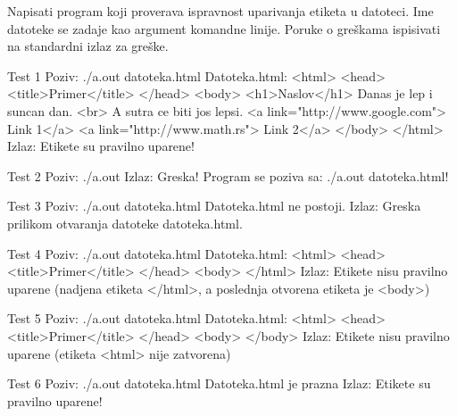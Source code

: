 \begin{Exercise}[label=605]
Napisati program koji proverava ispravnost uparivanja etiketa u  datoteci. Ime datoteke se zadaje kao argument komandne linije.
Poruke o greškama ispisivati na standardni izlaz za greške.
\begin{maxitest}
\begin{test}{Test 1}
Poziv: ./a.out datoteka.html
Datoteka.html:                          
<html>                                  
  <head>
    <title>Primer</title>
  </head>               
  <body>                                           
    <h1>Naslov</h1>                                
    Danas je lep i suncan dan. <br>                
    A sutra ce biti jos lepsi.     
    <a link="http://www.google.com"> Link 1</a>    
    <a link="http://www.math.rs"> Link 2</a>
  </body>
</html>
Izlaz: 
  Etikete su pravilno uparene!
\end{test}
\end{maxitest}
\begin{miditest}
\begin{test}{Test 2}
Poziv: ./a.out 
Izlaz: 
  Greska! Program se poziva 
  sa: ./a.out datoteka.html!
\end{test}
\end{miditest}
\begin{miditest}
\begin{test}{Test 3}
Poziv: ./a.out datoteka.html
Datoteka.html ne postoji.
Izlaz: 
  Greska prilikom otvaranja 
  datoteke datoteka.html.
\end{test}
\end{miditest}
\begin{miditest}    
\begin{test}{Test 4}
Poziv: ./a.out datoteka.html
Datoteka.html:                         
<html>                                 
  <head>
  	<title>Primer</title>
  </head>               
  <body>  
</html>
Izlaz: 
  Etikete nisu pravilno uparene
  (nadjena etiketa </html>, a poslednja otvorena etiketa je <body>)
\end{test}
\end{miditest}
\begin{miditest}      
\begin{test}{Test 5}
Poziv: ./a.out datoteka.html
Datoteka.html:                         
<html>                                  
  <head>
  	<title>Primer</title>
  </head>               
  <body>  
  </body>
Izlaz: 
  Etikete nisu pravilno uparene
  (etiketa <html> nije zatvorena)
\end{test}
\end{miditest}
\begin{miditest}
\begin{test}{Test 6}
Poziv: ./a.out datoteka.html
Datoteka.html je prazna
Izlaz: 
  Etikete su pravilno uparene!
\end{test}
\end{miditest}
\end{Exercise}
